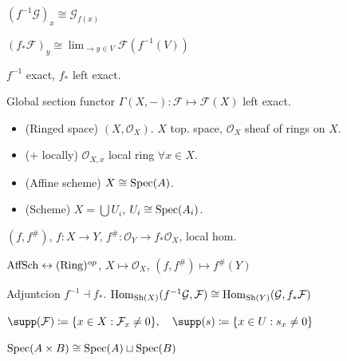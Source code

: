 \begin{proposition}
$(f^{-1}\mathcal{G})_x \cong \mathcal{G}_{f(x)}$
\end{proposition}

\begin{proposition}
$(f_* \mathcal{F} )_y \cong \lim_{\to y \in V} \mathcal{F}(f^{-1}(V))$
\end{proposition}

\begin{proposition} $f^{-1}$ exact, $f_*$ left exact.
\end{proposition}

\begin{proposition}
Global section functor $\Gamma(X, -) : \mathcal{F} \mapsto \mathcal{F}(X)$ left exact.
\end{proposition}

\begin{definition}
\begin{itemize}[topsep=-6pt, itemsep=0pt]
    \item (Ringed space) $(X, \mathcal{O}_X )$. $X$ top. space, $\mathcal{O}_X$ sheaf of rings on $X$.
    \item (+ locally) $\mathcal{O}_{X,x}$ local ring $\forall x \in X$.
    \item (Affine scheme) $X \cong \operatorname{Spec}(A)$.
    \item (Scheme) $X = \bigcup U_i$, $U_i \cong \operatorname{Spec}(A_i)$.
\end{itemize}
\end{definition}

\begin{definition}
$(f, f^\#)$, $f : X \to Y$, $f^\#: \mathcal{O}_Y \to f_* \mathcal{O}_X$, local hom.
\end{definition}

\begin{proposition} $\operatorname{AffSch} \leftrightarrow (\operatorname{Ring})^{op}$, $X \mapsto  \mathcal{O}_X $, $(f, f^{\#}) \mapsto f^{\#}(Y)$
\end{proposition}

\begin{proposition} Adjuntcion $f^{-1} \dashv f_*$. 
$\operatorname{Hom} _{\operatorname{Sh}(X)} (f^{-1} \mathcal{G}, \mathcal{F}) \cong \operatorname{Hom} _{\operatorname{Sh}(Y)} (\mathcal{G}, f_* \mathcal{F})$
\end{proposition}

\begin{definition} $\supp (\mathcal{F} ) \coloneqq  \{ x \in X : \mathcal{F}_x \neq 0  \}, \quad  \supp (s) \coloneqq \{ x \in U : s_x \neq 0 \}$
\end{definition}

\begin{proposition} $\operatorname{Spec}(A \times B) \cong \operatorname{Spec}(A) \sqcup \operatorname{Spec}(B)$
\end{proposition}

